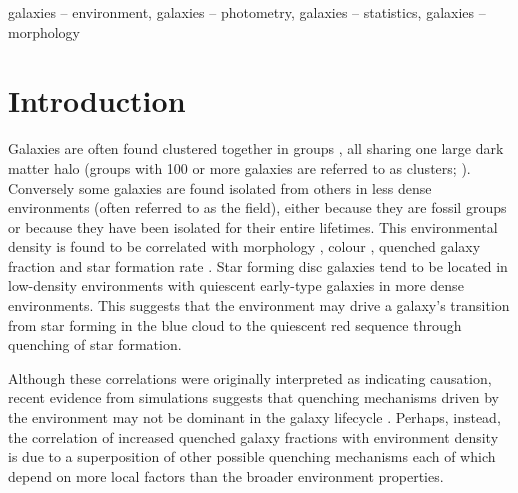 \documentclass[useAMS,usenatbib]{mn2e}
\begin{document}
\begin{keywords}
galaxies -- environment, galaxies -- photometry, galaxies -- statistics, galaxies -- morphology
\end{keywords}


\section{Introduction}\label{sec:intro}

Galaxies are often found clustered together in groups \citep{zwicky38, zwicky52, abell58}, all sharing one large dark matter halo (groups with 100 or more galaxies are referred to as clusters; \citealt{bower04}). Conversely some galaxies are found isolated from others in less dense environments (often referred to as the field), either because they are fossil groups \citep[where all members have eventually merged;][]{ponman94, jones00, jones03} or because they have been isolated for their entire lifetimes. This environmental density is found to be correlated with morphology \citep{dressler80, smail97, poggianti99, postman05, Bamford09}, colour \citep{butcher78, pimbblet02}, quenched galaxy fraction \citep{kauffmann03, Baldry06, peng12, darvish16} and star formation rate \citep[SFR; ][]{gomez03}. Star forming disc galaxies tend to be located in low-density environments with quiescent early-type galaxies in more dense environments. This suggests that the environment may drive a galaxy's transition from star forming in the blue cloud to the quiescent red sequence through quenching of star formation. 
 
Although these correlations were originally interpreted as indicating causation, recent evidence from simulations suggests that quenching mechanisms driven by the environment may not be dominant in the galaxy lifecycle \citep{kimm09, kimm11, hirschmann14, wang14, phillips15, emerick16, fillingham16}. Perhaps, instead, the correlation of increased quenched galaxy fractions with environment density is due to a superposition of other possible quenching mechanisms each of which depend on more local factors than the broader environment properties. 
  
\end{document}
